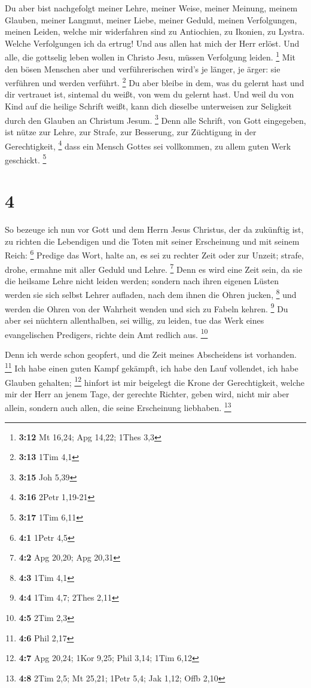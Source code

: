  Du aber bist nachgefolgt meiner Lehre, meiner Weise,
meiner Meinung, meinem Glauben, meiner Langmut, meiner Liebe, meiner
Geduld,  meinen Verfolgungen, meinen Leiden, welche mir
widerfahren sind zu Antiochien, zu Ikonien, zu Lystra. Welche
Verfolgungen ich da ertrug! Und aus allen hat mich der Herr erlöst.
 Und alle, die gottselig leben wollen in Christo Jesu,
müssen Verfolgung leiden. \footnote{\textbf{3:12} Mt 16,24; Apg 14,22;
  1Thes 3,3}  Mit den bösen Menschen aber und
verführerischen wird's je länger, je ärger: sie verführen und werden
verführt. \footnote{\textbf{3:13} 1Tim 4,1}  Du aber bleibe
in dem, was du gelernt hast und dir vertrauet ist, sintemal du weißt,
von wem du gelernt hast.  Und weil du von Kind auf die
heilige Schrift weißt, kann dich dieselbe unterweisen zur Seligkeit
durch den Glauben an Christum Jesum. \footnote{\textbf{3:15} Joh 5,39}
 Denn alle Schrift, von Gott eingegeben, ist nütze zur
Lehre, zur Strafe, zur Besserung, zur Züchtigung in der Gerechtigkeit,
\footnote{\textbf{3:16} 2Petr 1,19-21}  dass ein Mensch
Gottes sei vollkommen, zu allem guten Werk geschickt. \footnote{\textbf{3:17}
  1Tim 6,11}

\hypertarget{section-1}{%
\section{4}\label{section-1}}

 So bezeuge ich nun vor Gott und dem Herrn Jesus Christus,
der da zukünftig ist, zu richten die Lebendigen und die Toten mit seiner
Erscheinung und mit seinem Reich: \footnote{\textbf{4:1} 1Petr 4,5}
 Predige das Wort, halte an, es sei zu rechter Zeit oder zur
Unzeit; strafe, drohe, ermahne mit aller Geduld und Lehre. \footnote{\textbf{4:2}
  Apg 20,20; Apg 20,31}  Denn es wird eine Zeit sein, da sie
die heilsame Lehre nicht leiden werden; sondern nach ihren eigenen
Lüsten werden sie sich selbst Lehrer aufladen, nach dem ihnen die Ohren
jucken, \footnote{\textbf{4:3} 1Tim 4,1}  und werden die
Ohren von der Wahrheit wenden und sich zu Fabeln kehren. \footnote{\textbf{4:4}
  1Tim 4,7; 2Thes 2,11}  Du aber sei nüchtern allenthalben,
sei willig, zu leiden, tue das Werk eines evangelischen Predigers,
richte dein Amt redlich aus. \footnote{\textbf{4:5} 2Tim 2,3}

 Denn ich werde schon geopfert, und die Zeit meines
Abscheidens ist vorhanden. \footnote{\textbf{4:6} Phil 2,17}
 Ich habe einen guten Kampf gekämpft, ich habe den Lauf
vollendet, ich habe Glauben gehalten; \footnote{\textbf{4:7} Apg 20,24;
  1Kor 9,25; Phil 3,14; 1Tim 6,12}  hinfort ist mir
beigelegt die Krone der Gerechtigkeit, welche mir der Herr an jenem
Tage, der gerechte Richter, geben wird, nicht mir aber allein, sondern
auch allen, die seine Erscheinung liebhaben. \footnote{\textbf{4:8} 2Tim
  2,5; Mt 25,21; 1Petr 5,4; Jak 1,12; Offb 2,10}

